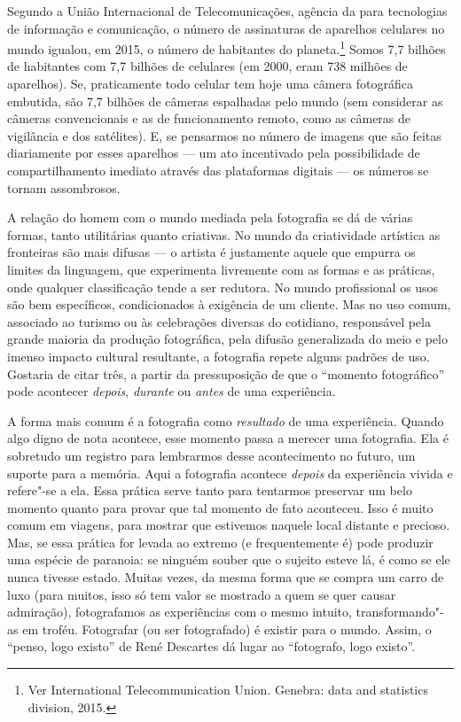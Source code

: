 Segundo a União Internacional
de Telecomunicações, agência da  para tecnologias de informação e
comunicação, o número de assinaturas de aparelhos celulares no mundo
igualou, em 2015, o número de habitantes do planeta.\footnote{Ver
  International Telecommunication Union. {} Genebra:  data and statistics division, 2015.}
Somos 7,7 bilhões de habitantes com 7,7 bilhões de celulares (em 2000, eram 738 milhões de aparelhos). Se, praticamente todo celular tem hoje uma câmera fotográfica embutida, são 7,7 bilhões de câmeras espalhadas pelo mundo (sem considerar as
câmeras convencionais e as de funcionamento remoto, como as câmeras de
vigilância e dos satélites). E, se pensarmos no número de imagens que
são feitas diariamente por esses aparelhos --- um ato incentivado pela
possibilidade de compartilhamento imediato através das plataformas
digitais --- os números se tornam assombrosos.

A relação do homem com o mundo mediada pela fotografia se dá de várias
formas, tanto utilitárias quanto criativas. No mundo da criatividade
artística as fronteiras são mais difusas --- o artista é justamente aquele que empurra os limites da linguagem, que experimenta livremente com as formas e as práticas, onde qualquer classificação tende a ser redutora. No
mundo profissional os usos são bem específicos, condicionados à
exigência de um cliente. Mas no uso comum, associado ao turismo ou às
celebrações diversas do cotidiano, responsável pela grande maioria da
produção fotográfica, pela difusão generalizada do meio e pelo imenso
impacto cultural resultante, a fotografia repete alguns padrões de uso.
Gostaria de citar três, a partir da pressuposição de que o ``momento
fotográfico'' pode acontecer \emph{depois}, \emph{durante} ou
\emph{antes} de uma experiência.

A forma mais comum é a fotografia como \emph{resultado} de uma
experiência. Quando algo digno de nota acontece, esse momento passa a
merecer uma fotografia. Ela é sobretudo um registro para lembrarmos
desse acontecimento no futuro, um suporte para a memória. Aqui a
fotografia acontece \emph{depois} da experiência vivida e refere"-se a
ela. Essa prática serve tanto para tentarmos preservar um belo momento
quanto para provar que tal momento de fato aconteceu. Isso é muito comum
em viagens, para mostrar que estivemos naquele local distante e
precioso. Mas, se essa prática for levada ao extremo (e frequentemente
é) pode produzir uma espécie de paranoia: se ninguém souber que o
sujeito esteve lá, é como se ele nunca tivesse estado. Muitas vezes, da
mesma forma que se compra um carro de luxo (para muitos, isso só tem
valor se mostrado a quem se quer causar admiração), fotografamos as
experiências com o mesmo intuito, transformando"-as em troféu. Fotografar
(ou ser fotografado) é existir para o mundo. Assim, o ``penso, logo
existo'' de René Descartes dá lugar ao ``fotografo, logo existo''.

